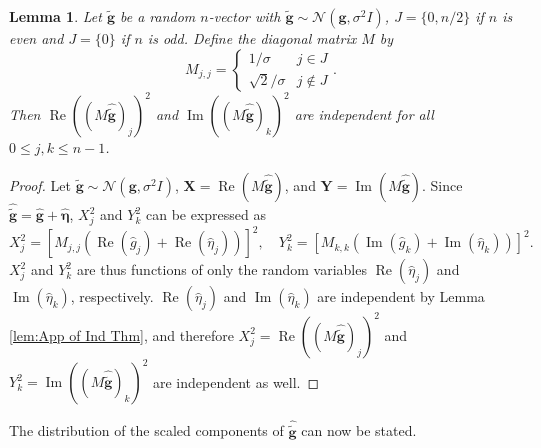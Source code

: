 \documentclass[12pt,notitlepage]{report}
\newcommand{\gVec}{\mathbf{g}}	%
\newcommand{\gnoiseVec}{\widetilde{\mathbf{g}}}	%
\newcommand{\noise}{\eta}	%
\newcommand{\noiseSD}{\sigma}	%
\newcommand{\noiseVec}{\bm{\noise}}	%
\renewcommand{\Re}{\operatorname{Re}}	%
\renewcommand{\Im}{\operatorname{Im}}	%
\newtheorem{lemma}{Lemma}[section]
\begin{document}
\begin{lemma}
\label{lem:App of Ind Thm 2}
Let $\gnoiseVec$ be a random $n$-vector with $\gnoiseVec \sim \mathcal{N}(\gVec,\noiseSD^2 I)$, $J = \{0,n/2\}$ if $n$ is even and $J = \{0\}$ if $n$ is odd. Define the diagonal matrix $M$ by
\[M_{j,j} = \begin{cases}
1/\noiseSD & j \in J \\
\sqrt{2}/\noiseSD & j \not\in J
\end{cases}.\]
Then $\Re((M\widehat{\gnoiseVec})_j)^2$ and $\Im((M\widehat{\gnoiseVec})_k)^2$ are independent for all $0 \leq j,k \leq n-1$.
\end{lemma}
\begin{proof}
Let $\gnoiseVec \sim \mathcal{N}(\gVec,\noiseSD^2 I)$, $\mathbf{X} = \Re(M\widehat{\gnoiseVec})$, and $\mathbf{Y} = \Im(M\widehat{\gnoiseVec})$. Since $\widehat{\gnoiseVec} = \widehat{\gVec} + \widehat{\noiseVec}$, $X_j^2$ and $Y_k^2$ can be expressed as 
\[X_j^2 = [M_{j,j}(\Re(\widehat{g}_j) + \Re(\widehat{\noise}_j))]^2, \quad Y_k^2 = [M_{k,k}(\Im(\widehat{g}_k) + \Im(\widehat{\noise}_k))]^2.\]
$X_j^2$ and $Y_k^2$ are thus functions of only the random variables $\Re(\widehat{\noise}_j)$ and $\Im(\widehat{\noise}_k)$, respectively. $\Re(\widehat{\noise}_j)$ and $\Im(\widehat{\noise}_k)$ are independent by Lemma \ref{lem:App of Ind Thm}, and therefore $X_j^2 = \Re((M\widehat{\gnoiseVec})_j)^2$ and $Y_k^2 = \Im((M\widehat{\gnoiseVec})_k)^2$ are independent as well.
\end{proof}

The distribution of the scaled components of $\widehat{\gnoiseVec}$ can now be stated. 
\end{document}
